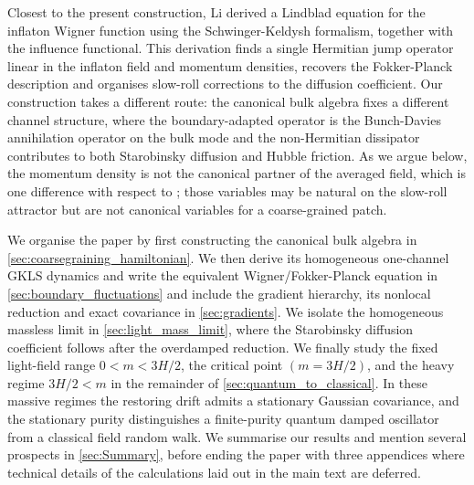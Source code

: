 \documentclass{article}
\numberwithin{equation}{section}
\begin{document}
	
	Closest to the present construction, Li \cite{Li2026Stochastic,Li2026lwl} derived a Lindblad equation for the inflaton Wigner function using the Schwinger-Keldysh formalism, together with the influence functional. This derivation finds a single Hermitian jump operator linear in the inflaton field and momentum densities, recovers the Fokker-Planck description and organises slow-roll corrections to the diffusion coefficient. Our construction takes a different route: the canonical bulk algebra fixes a different channel structure, where the boundary-adapted operator is the Bunch-Davies annihilation operator on the bulk mode and the non-Hermitian dissipator contributes to both Starobinsky diffusion and Hubble friction. As we argue below, the momentum density is not the canonical partner of the averaged field, which is one difference with respect to \cite{Li2026Stochastic,Li2026lwl}; those variables may be natural on the slow-roll attractor but are not canonical variables for a coarse-grained patch.

	We organise the paper by first constructing the canonical bulk algebra in \cref{sec:coarsegraining_hamiltonian}. We then derive its homogeneous one-channel GKLS dynamics and write the equivalent Wigner/Fokker-Planck equation in \cref{sec:boundary_fluctuations} and include the gradient hierarchy, its nonlocal reduction and exact covariance in \cref{sec:gradients}. We isolate the homogeneous massless limit in \cref{sec:light_mass_limit}, where the Starobinsky diffusion coefficient follows after the overdamped reduction. We finally study the fixed light-field range \(0<m<3H/2\), the critical point $(m=3H/2)$, and the heavy regime \(3H/2<m\) in the remainder of \cref{sec:quantum_to_classical}. In these massive regimes the restoring drift admits a stationary Gaussian covariance, and the stationary purity distinguishes a finite-purity quantum damped oscillator from a classical field random walk. We summarise our results and mention several prospects in \cref{sec:Summary}, before ending the paper with three appendices where technical details of the calculations laid out in the main text are deferred.
\end{document}
